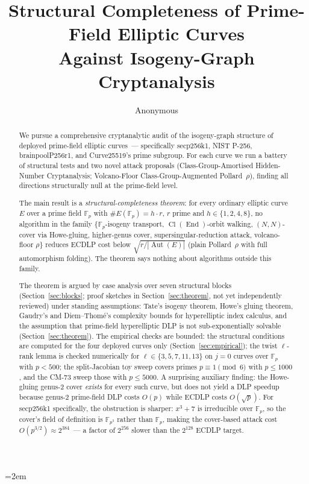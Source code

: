 \documentclass[11pt,a4paper]{article}
\title{Structural Completeness of Prime-Field Elliptic Curves \\
       Against Isogeny-Graph Cryptanalysis}
\author{Anonymous}
\date{}
\theoremstyle{definition}
\newcommand{\FF}{\mathbb{F}}
\newcommand{\End}{\operatorname{End}}
\newcommand{\Aut}{\operatorname{Aut}}
\newcommand{\Cl}{\operatorname{Cl}}
\begin{document}
\maketitle
\emergencystretch=2em

\begin{abstract}
We pursue a comprehensive cryptanalytic audit of the isogeny-graph
structure of deployed prime-field elliptic curves~--- specifically
secp256k1, NIST P-256, brainpoolP256r1, and Curve25519's prime
subgroup. For each curve we run a battery of structural tests and
two novel attack proposals (Class-Group-Amortised Hidden-Number
Cryptanalysis; Volcano-Floor Class-Group-Augmented Pollard~$\rho$),
finding all directions structurally null at the prime-field level.

The main result is a \emph{structural-completeness theorem}: for
every ordinary elliptic curve $E$ over a prime field $\FF_p$ with
$\#E(\FF_p) = h \cdot r$, $r$ prime and $h \in \{1,2,4,8\}$, no
algorithm in the family $\{$$\FF_p$-isogeny transport,
$\Cl(\End)$-orbit walking, $(N,N)$-cover via Howe-gluing,
higher-genus cover, supersingular-reduction attack, volcano-floor
$\rho\}$ reduces ECDLP cost below $\sqrt{r / |\Aut(E)|}$ (plain
Pollard~$\rho$ with full automorphism folding).  The theorem says
nothing about algorithms outside this family.

The theorem is argued by case analysis over seven structural blocks
(Section~\ref{sec:blocks}; proof sketches in
Section~\ref{sec:theorem}, not yet independently reviewed) under
standing assumptions: Tate's
isogeny theorem, Howe's gluing theorem, Gaudry's and Diem--Thom\'e's
complexity bounds for hyperelliptic index calculus, and the
assumption that prime-field hyperelliptic DLP is not
sub-exponentially solvable (Section~\ref{sec:theorem}).
The empirical checks are bounded: the structural conditions are
computed for the four deployed curves only
(Section~\ref{sec:empirical}); the twist $\ell$-rank lemma is
checked numerically for $\ell \in \{3,5,7,11,13\}$ on $j = 0$ curves over
$\FF_p$ with $p < 500$; the split-Jacobian toy sweep covers primes
$p \equiv 1 \pmod 6$ with $p \le 1000$, and the CM-73 sweep those with
$p \le 5000$. A surprising
auxiliary finding: the Howe-gluing genus-2 cover \emph{exists} for
every such curve, but does not yield a DLP speedup because
genus-2 prime-field DLP costs $O(p)$ while ECDLP costs
$O(\sqrt{p})$.  For secp256k1 specifically, the obstruction is
sharper: $x^3 + 7$ is irreducible over $\FF_p$, so the cover's
field of definition is $\FF_{p^3}$ rather than $\FF_p$, making
the cover-based attack cost $O(p^{3/2}) \approx 2^{384}$~---
a factor of $2^{256}$ slower than the $2^{128}$ ECDLP target.
\end{abstract}
\end{document}
